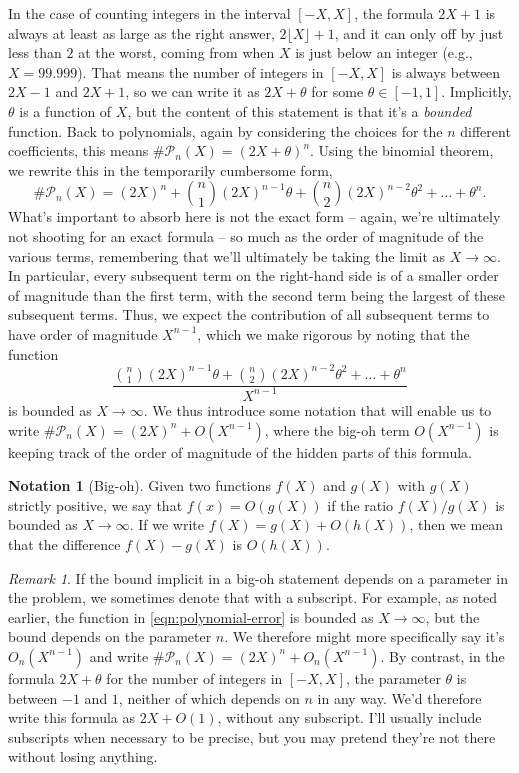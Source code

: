\documentclass[12pt]{amsart}
\theoremstyle{definition} \newtheorem*{notation}{Notation}
\theoremstyle{remark} \newtheorem*{remark}{Remark}
\theoremstyle{remark} \newtheorem*{example}{Example}
\theoremstyle{definition} \newtheorem*{definition}{Definition}
\numberwithin{equation}{section}
\numberwithin{theorem}{section}
\begin{document}
	In the case of counting integers in the interval $[-X,X]$, the formula $2X+1$ is always at least as large as the right answer, $2\lfloor X\rfloor +1$, and it can only off by just less than $2$ at the worst, coming from when $X$ is just below an integer (e.g., $X = 99.999$).  That means the number of integers in $[-X,X]$ is always between $2X-1$ and $2X+1$, so we can write it as $2X+\theta$ for some $\theta \in [-1,1]$.  Implicitly, $\theta$ is a function of $X$, but the content of this statement is that it's a \emph{bounded} function.  Back to polynomials, again by considering the choices for the $n$ different coefficients, this means $\#\mathcal{P}_n(X) = (2X+\theta)^n$.  Using the binomial theorem, we rewrite this in the temporarily cumbersome form,
		\[
			\#\mathcal{P}_n(X)
				= (2X)^n + \binom{n}{1} (2X)^{n-1} \theta + \binom{n}{2} (2X)^{n-2} \theta^2 + \dots + \theta^n.
		\]
	What's important to absorb here is not the exact form -- again, we're ultimately not shooting for an exact formula -- so much as the order of magnitude of the various terms, remembering that we'll ultimately be taking the limit as $X \to \infty$.  In particular, every subsequent term on the right-hand side is of a smaller order of magnitude than the first term, with the second term being the largest of these subsequent terms.  Thus, we expect the contribution of all subsequent terms to have order of magnitude $X^{n-1}$, which we make rigorous by noting that the function
		\begin{equation}\label{eqn:polynomial-error}
			\frac{\binom{n}{1} (2X)^{n-1} \theta + \binom{n}{2} (2X)^{n-2} \theta^2 + \dots + \theta^n}{X^{n-1}}
		\end{equation}
	is bounded as $X \to \infty$.  We thus introduce some notation that will enable us to write $\#\mathcal{P}_n(X) = (2X)^n + O(X^{n-1})$, where the big-oh term $O(X^{n-1})$ is keeping track of the order of magnitude of the hidden parts of this formula.
	
	\begin{notation}[Big-oh]
		Given two functions $f(X)$ and $g(X)$ with $g(X)$ strictly positive, we say that $f(x) = O(g(X))$ if the ratio $f(X) / g(X)$ is bounded as $X \to \infty$.  If we write $f(X) = g(X) + O(h(X))$, then we mean that the difference $f(X)-g(X)$ is $O(h(X))$.  
	\end{notation}
	
	\begin{remark}
		If the bound implicit in a big-oh statement depends on a parameter in the problem, we sometimes denote that with a subscript.  For example, as noted earlier, the function in \eqref{eqn:polynomial-error} is bounded as $X\to \infty$, but the bound depends on the parameter $n$.  We therefore might more specifically say it's $O_n(X^{n-1})$ and write $\#\mathcal{P}_n(X) = (2X)^n + O_n(X^{n-1})$.  By contrast, in the formula $2X + \theta$ for the number of integers in $[-X,X]$, the parameter $\theta$ is between $-1$ and $1$, neither of which depends on $n$ in any way.  We'd therefore write this formula as $2X + O(1)$, without any subscript.  I'll usually include subscripts when necessary to be precise, but you may pretend they're not there without losing anything.
	\end{remark}
	
\end{document}
